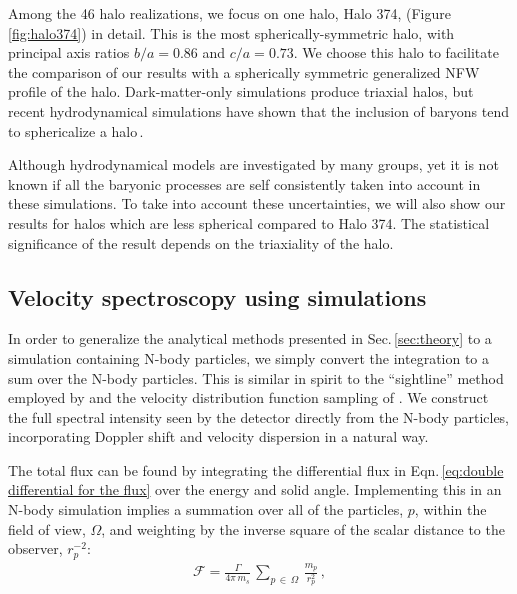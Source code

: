 \documentclass[aps,prd,10pt,twocolumn,superscriptaddress,showpacs]{revtex4-1}
\begin{document}
Among the 46 halo realizations, we focus on one halo, Halo 374, (Figure\,\ref{fig:halo374}) in detail. This is the most spherically-symmetric halo, with principal axis ratios $b/a=0.86$ and $c/a=0.73$.  We choose this halo to facilitate the comparison of our results with a spherically symmetric generalized NFW profile of the halo.  Dark-matter-only simulations produce triaxial halos, but recent hydrodynamical simulations have shown that the inclusion of baryons tend to sphericalize a halo\,\cite{Debattista:2007yz,Bryan:2012mw,Bernal:2014mmt,Bernal:2016guq}.

Although hydrodynamical models are investigated by many groups, yet it is not known if all the baryonic processes are self consistently taken into account in these simulations.  To take into account these uncertainties, we will also show our results for halos which are less spherical compared to Halo 374.  The statistical significance of the result depends on the triaxiality of the halo.


\subsection{Velocity spectroscopy using simulations}
\label{sec:simulations}

In order to generalize the analytical methods presented in Sec.\,\ref{sec:theory} to a simulation
containing N-body particles, we simply convert the integration to a sum over the N-body particles.
This is similar in spirit to the ``sightline'' method employed by \cite{Lovell:2014lea} and the
velocity distribution function sampling of \cite{Mao:2012hf}.  We construct the full spectral
intensity seen by the detector directly from the N-body particles, incorporating Doppler shift and
velocity dispersion in a natural way.   


The total flux can be found by integrating the differential flux in Eqn.\,\ref{eq:double differential for the flux} over the energy and solid angle.  Implementing this in an N-body simulation implies a summation over all of the particles, $p$, within the field of view, $\Omega$, and weighting by the inverse square of the scalar distance to the observer, $r^{-2}_p$:
\begin{eqnarray} 
\mathcal{F} = \frac{\Gamma}{4\pi \, m_s} \, \sum_{p \, \in \, \Omega} \, \frac{m_p}{r_p^{2}} \, ,
\end{eqnarray}
\end{document}
